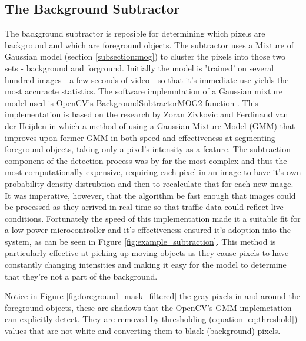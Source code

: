 \subsection{The Background Subtractor}
\label{subsection:training}
The background subtractor is reposible for determining which pixels are background and which are foreground objects. The subtractor uses a Mixture of Gaussian model (section \ref{subsection:mog}) to cluster the pixels into those two sets - background and forground. Initially the model is 'trained' on several hundred images - a few seconds of video - so that it's immediate use yields the most accuracte statistics. The software implemntation of a Gaussian mixture model used is OpenCV's BackgroundSubtractorMOG2 function \cite{opencv_mog2}. This implementation is based on the research by Zoran Zivkovic and Ferdinand van der Heijden \cite{zivkovic_pattern_recognition} \cite{zivkovic_heijden_pattern_recognition_letters} in which a method of using a Gaussian Mixture Model (GMM) that improves upon former GMM in both speed and effectiveness at segmenting foreground objects, taking only a pixel's intensity as a feature. The subtraction component of the detection process was by far the most complex and thus the most computationally expensive, requiring each pixel in an image to have it's own probability density distrubtion and then to recalculate that for each new image. It was imperative, however, that the algorithm be fast enough that images could be processed as they arrived in real-time so that traffic data could reflect live conditions. Fortunately the speed of this implementation made it a suitable fit for a low power microcontroller and it's effectiveness ensured it's adoption into the system, as can be seen in Figure \ref{fig:example_subtraction}. This method is particularly effective at picking up moving objects as they cause pixels to have constantly changing intensities and making it easy for the model to determine that they're not a part of the background. 

Notice in Figure \ref{fig:foreground_mask_filtered} the gray pixels in and around the foreground objects, these are shadows that the OpenCV's GMM implemetation can explicitly detect. They are removed by thresholding (equation \ref{eq:threshold}) values that are not white and converting them to black (background) pixels.

